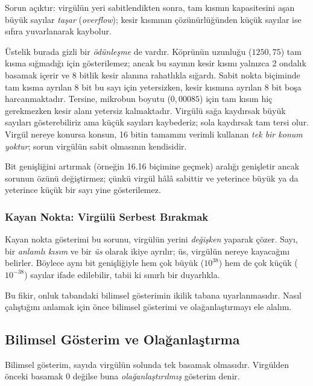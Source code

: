 Sorun açıktır: virgülün yeri sabitlendikten sonra, tam kısmın kapasitesini aşan büyük sayılar \emph{taşar} (\emph{overflow}); kesir kısmının çözünürlüğünden küçük sayılar ise sıfıra yuvarlanarak kaybolur.

Üstelik burada gizli bir \emph{ödünleşme} de vardır. Köprünün uzunluğu ($1250{,}75$) tam kısma sığmadığı için gösterilemez; ancak bu sayının kesir kısmı yalnızca 2 ondalık basamak içerir ve 8 bitlik kesir alanına rahatlıkla sığardı. Sabit nokta biçiminde tam kısma ayrılan 8 bit bu sayı için yetersizken, kesir kısmına ayrılan 8 bit boşa harcanmaktadır. Tersine, mikrobun boyutu ($0{,}00085$) için tam kısım hiç gerekmezken kesir alanı yetersiz kalmaktadır. Virgülü sağa kaydırsak büyük sayıları gösterebiliriz ama küçük sayıları kaybederiz; sola kaydırsak tam tersi olur. Virgül nereye konursa konsun, 16 bitin tamamını verimli kullanan \emph{tek bir konum yoktur}; sorun virgülün sabit olmasının kendisidir.

Bit genişliğini artırmak (örneğin 16.16 biçimine geçmek) aralığı genişletir ancak sorunun özünü değiştirmez; çünkü virgül hâlâ sabittir ve yeterince büyük ya da yeterince küçük bir sayı yine gösterilemez.

\subsubsection{Kayan Nokta: Virgülü Serbest Bırakmak}

Kayan nokta gösterimi bu sorunu, virgülün yerini \emph{değişken} yaparak çözer. Sayı, bir \emph{anlamlı kısım} ve bir \emph{üs} olarak ikiye ayrılır; üs, virgülün nereye kayacağını belirler. Böylece aynı bit genişliğiyle hem çok büyük ($10^{38}$) hem de çok küçük ($10^{-38}$) sayılar ifade edilebilir, tabii ki sınırlı bir duyarlıkla.

Bu fikir, onluk tabandaki bilimsel gösterimin ikilik tabana uyarlanmasıdır. Nasıl çalıştığını anlamak için önce bilimsel gösterimi ve olağanlaştırmayı ele alalım.

\subsection{Bilimsel Gösterim ve Olağanlaştırma}

Bilimsel gösterim, sayıda virgülün solunda tek basamak olmasıdır. Virgülden önceki basamak 0 değilse buna \emph{olağanlaştırılmış} gösterim denir.

